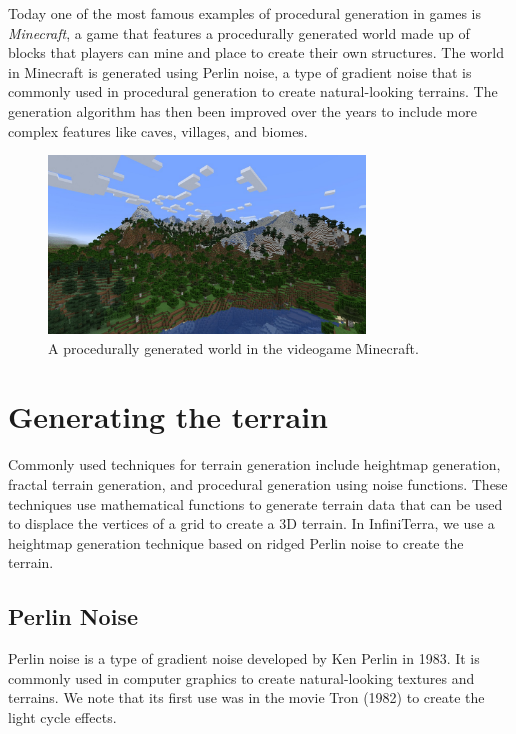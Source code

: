 \documentclass{article}
\begin{document}
Today one of the most famous examples of procedural generation in games is \textit{Minecraft}, a
game that features a procedurally generated world made up of blocks that players can mine and place
to create their own structures. The world in Minecraft is generated using Perlin noise, a type of
gradient noise that is commonly used in procedural generation to create natural-looking terrains.
The generation algorithm has then been improved over the years to include more complex features
like caves, villages, and biomes.

\begin{figure}[H]
	\centering
	\includegraphics[width=0.75\textwidth]{img/minecraft.jpg}
	\caption{A procedurally generated world in the videogame Minecraft.}
	\label{fig:minecraft}
\end{figure}


\section{Generating the terrain}
\label{ch:generating-the-terrain}
Commonly used techniques for terrain generation include heightmap generation, fractal terrain
generation, and procedural generation using noise functions. These techniques use mathematical
functions to generate terrain data that can be used to displace the vertices of a grid to create a
3D terrain. In InfiniTerra, we use a heightmap generation technique based on ridged Perlin noise to
create the terrain.
\subsection{Perlin Noise}
Perlin noise is a type of gradient noise developed by Ken Perlin in 1983. It is commonly used in
computer graphics to create natural-looking textures and terrains. We note that its first use was
in the movie Tron (1982) to create the light cycle effects.
\end{document}
